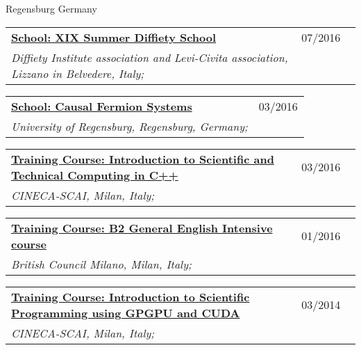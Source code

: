 \documentclass[a4paper]{article}
\newcommand{\longvoice}[8]{
    \begin{tabular}{p{0.83\linewidth} p{0.17\linewidth} }
        \textbf{\href{#3}{#2: #1}} & #4 
        \\ 
        \textit{#5, #6, #7;} & {\small\emph{#8}}
    \end{tabular}
    \vspace{.5em}
}
\begin{document}
        {Regensburg}
        {Germany}
        {}
    \longvoice{XIX Summer Diffiety School}
        {School}
        {https://web.archive.org/web/20170623170547/https://sites.google.com/site/levicivitainstitute//Activities/DiffietySchools/xix-summer-diffiety-school}
        {07/2016}
        {Diffiety Institute association and Levi-Civita association}
        {Lizzano in Belvedere}
        {Italy}
        {}
    \longvoice{Causal Fermion Systems}
        {School}
        {https://web.archive.org/web/20170623170718/http://www.uni-regensburg.de/mathematics/causal-fermion-systems/}
        {03/2016}
        {University of Regensburg}
        {Regensburg}
        {Germany}
        {}
    \longvoice{Introduction to Scientific and Technical Computing in C++}
        {Training Course}
        {https://web.archive.org/save/http://www.hpc.cineca.it/content/introduction-object-oriented}
        {03/2016}
        {CINECA-SCAI}
        {Milan}
        {Italy}
        {}
    \longvoice{B2 General English Intensive course}
        {Training Course}
        {https://www.britishcouncil.it/en/english/courses-adults/general}
        {01/2016}
        {British Council Milano}
        {Milan}
        {Italy}
        {}
    \longvoice{Introduction to Scientific Programming using GPGPU and CUDA}
        {Training Course}
        {https://web.archive.org/web/20170623171128/http://www.hpc.cineca.it/content/introduction-to-gpu}
        {03/2014}
        {CINECA-SCAI}
        {Milan}
        {Italy}
        {}
\end{document}
